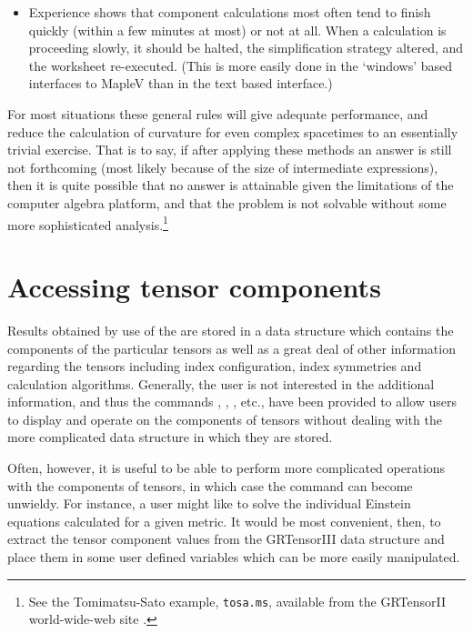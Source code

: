 \documentclass{article}
\begin{document}
{{{\begin{itemize}
    to substitute the explicit forms of the functions \textsl{after} a
    more general calculation is completed. For both coordinate and
    tetrad calculations the removal of trigonometric and like
    functions via elementary transformations (such as $u(\theta) :=
    \cos\theta$) will often improve performance.
%
  \item Experience shows that component calculations most often tend
    to finish quickly (within a few minutes at most) or not at
    all. When a calculation is proceeding slowly, it should be halted,
    the simplification strategy altered, and the worksheet
    re-executed. (This is more easily done in the `windows' based
    interfaces to MapleV than in the text based interface.)
\end{itemize}

For most situations these general rules will give adequate
performance, and reduce the calculation of curvature for even complex
spacetimes to an essentially trivial exercise. That is to say, if
after applying these methods an answer is still not forthcoming (most
likely because of the size of intermediate expressions), then it is
quite possible that no answer is attainable given the limitations of
the computer algebra platform, and that the problem is not solvable
without some more sophisticated analysis.\footnote{See the Tomimatsu-Sato
example, \texttt{tosa.ms}, available from the GRTensorII
world-wide-web site \cite{www}.}
%
\section{Accessing tensor components} \label{sec:grcomponent}
%
Results obtained by use of the  are stored in a data
structure which contains the components of the particular tensors as well
as a great deal of other information regarding the tensors including
index configuration, index symmetries and calculation algorithms. Generally,
the user is not interested in the additional information, and thus the
commands , , , etc., have
been provided to allow users to display and operate on the components of
tensors without dealing with the more complicated data structure in which
they are stored.

Often, however, it is useful to be able to perform more complicated
operations with the components of tensors, in which case the
 command can become unwieldy. For instance, a user might
like to solve the individual Einstein equations calculated for
a given metric. It would be most convenient, then, to extract the
tensor component values from the GRTensorIII data structure and place them
in some user defined variables which can be more easily manipulated.

}}}
\end{document}

